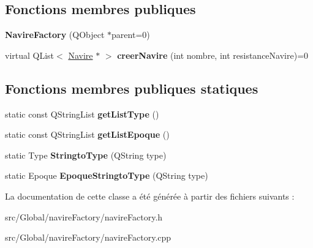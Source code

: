 \subsection*{Fonctions membres publiques}
\begin{DoxyCompactItemize}
\item 
{\bfseries Navire\+Factory} (Q\+Object $\ast$parent=0)\hypertarget{class_navire_factory_a7cb54df352b8abca46855b9c2dbbbdff}{}\label{class_navire_factory_a7cb54df352b8abca46855b9c2dbbbdff}

\item 
virtual Q\+List$<$ \hyperlink{class_navire}{Navire} $\ast$ $>$ {\bfseries creer\+Navire} (int nombre, int resistance\+Navire)=0\hypertarget{class_navire_factory_ad663ca3d3fdf6c080c28ce595b55cf21}{}\label{class_navire_factory_ad663ca3d3fdf6c080c28ce595b55cf21}

\end{DoxyCompactItemize}
\subsection*{Fonctions membres publiques statiques}
\begin{DoxyCompactItemize}
\item 
static const Q\+String\+List {\bfseries get\+List\+Type} ()\hypertarget{class_navire_factory_a55100c7a5b9b9c633bb8a7733fbb5f08}{}\label{class_navire_factory_a55100c7a5b9b9c633bb8a7733fbb5f08}

\item 
static const Q\+String\+List {\bfseries get\+List\+Epoque} ()\hypertarget{class_navire_factory_af077dc62c3e994fd7e30e62f3f02029b}{}\label{class_navire_factory_af077dc62c3e994fd7e30e62f3f02029b}

\item 
static Type {\bfseries Stringto\+Type} (Q\+String type)\hypertarget{class_navire_factory_ace4b810b9565550fbab8d5c0a4a690de}{}\label{class_navire_factory_ace4b810b9565550fbab8d5c0a4a690de}

\item 
static Epoque {\bfseries Epoque\+Stringto\+Type} (Q\+String type)\hypertarget{class_navire_factory_a5cc2fc8822fe08fbc120c35fd44d4d0c}{}\label{class_navire_factory_a5cc2fc8822fe08fbc120c35fd44d4d0c}

\end{DoxyCompactItemize}


La documentation de cette classe a été générée à partir des fichiers suivants \+:\begin{DoxyCompactItemize}
\item 
src/\+Global/navire\+Factory/navire\+Factory.\+h\item 
src/\+Global/navire\+Factory/navire\+Factory.\+cpp\end{DoxyCompactItemize}
